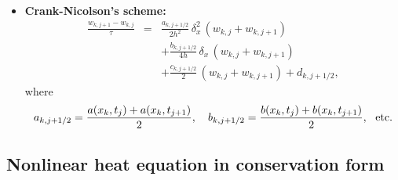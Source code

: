 \documentclass[12pt]{article}
\begin{document}
\begin{itemize}
\item \textbf{Crank-Nicolson's scheme:}
\begin{eqnarray}
\frac{w_{k,j+1}-w_{k,j}}{\tau} &=& \frac{a_{k,j+1/2}}{2h^{2}} \,
\delta_{x}^2 \, \left(w_{k,j}+w_{k,j+1}\right) \nonumber \\
&&+\frac{b_{k,j+1/2}}{4h} \, \delta_{x} \,  \left(w_{k,j}+w_{k,j+1}\right)\nonumber \\
&&
+\frac{c_{k,j+1/2}}{2} \, \left(w_{k,j}+w_{k,j+1}\right)+d_{k,j+1/2}, \nonumber
\end{eqnarray}
where
\[
a_{k,j+1/2}=\frac{a(x_{k},t_{j})+a(x_{k},t_{j+1})}{2}, \quad
b_{k,j+1/2}=\frac{b(x_{k},t_{j})+b(x_{k},t_{j+1})}{2}, \ \ {\rm etc.}
\]
\end{itemize}

\subsection*{Nonlinear heat equation in conservation form}
\end{document}
